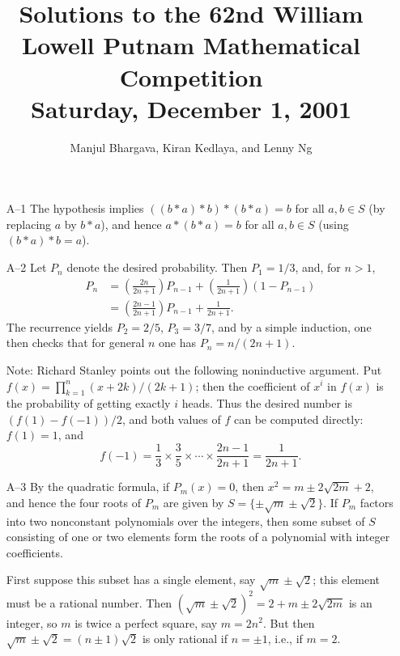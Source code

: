 \documentclass[amssymb,twocolumn,pra,10pt,aps]{revtex4-1}
\begin{document}
\title{Solutions to the 62nd William Lowell Putnam Mathematical Competition \\
    Saturday, December 1, 2001}
\author{Manjul Bhargava, Kiran Kedlaya, and Lenny Ng}
\noaffiliation
\maketitle

\begin{itemize}

\item[A--1]
The hypothesis implies $((b*a)*b)*(b*a)=b$ for all $a,b\in S$
(by replacing $a$ by $b*a$), and
hence $a*(b*a)=b$ for all $a,b\in S$ (using $(b*a)*b = a$).

\item[A--2]
Let $P_n$ denote the desired probability.  Then $P_1=1/3$, and, for
$n>1$,
\begin{align*}
 P_n &= \left(\frac{2n}{2n+1}\right) P_{n-1}
        +\left(\frac{1}{2n+1}\right) (1-P_{n-1}) \\
       &= \left(\frac{2n-1}{2n+1}\right)P_{n-1} + \frac{1}{2n+1}.
\end{align*}
The recurrence yields $P_2=2/5$, $P_3=3/7$, and by a simple
induction, one then checks that for general $n$ one has $P_n=n/(2n+1)$.

Note: Richard Stanley points out the following noninductive argument.
Put $f(x) = \prod_{k=1}^n (x+2k)/(2k+1)$; then the coefficient of
$x^i$ in $f(x)$ is the probability of getting exactly $i$ heads. Thus
the desired number is $(f(1) - f(-1))/2$, and both values of $f$ can
be computed directly: $f(1) = 1$, and
\[
f(-1) = \frac{1}{3} \times \frac{3}{5} \times \cdots \times \frac{2n-1}{2n+1}
= \frac{1}{2n+1}.
\]


\item[A--3]
By the quadratic formula, if $P_m(x)=0$, then $x^2=m\pm
2\sqrt{2m}+2$, and hence the four roots of $P_m$ are given by
$S = \{\pm\sqrt{m}\pm\sqrt{2}\}$. If $P_m$ factors into two nonconstant
polynomials over the integers, then some subset of $S$ consisting of one
or two elements form the roots of a polynomial with integer coefficients.

First suppose this subset has a single element, say $\sqrt{m} \pm \sqrt{2}$;
this element must be a rational number.
Then $(\sqrt{m} \pm \sqrt{2})^2 = 2 + m \pm  2 \sqrt{2m}$ is an integer,
so $m$ is twice a perfect square, say $m = 2n^2$. But then
$\sqrt{m} \pm \sqrt{2} = (n\pm 1)\sqrt{2}$ is only rational if $n=\pm 1$,
i.e., if $m = 2$.


\end{itemize}
\end{document}

